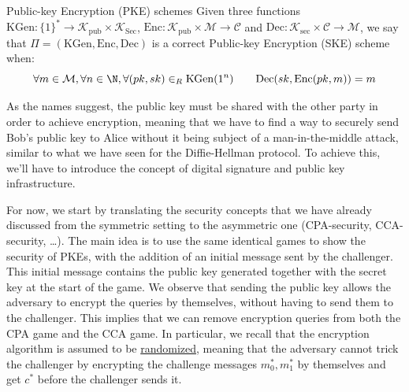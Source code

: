 \documentclass[a4paper, 12pt]{report}
\begin{document}
    \begin{frameddefn}{Public-key Encryption (PKE) schemes}
        Given three functions $\mathrm{KGen} : \{1\}^* \to \mathcal{K}_{\mathrm{pub}} \times \mathcal{K}_\mathrm{Sec}$, $\mathrm{Enc} : \mathcal{K}_{\mathrm{pub}} \times \mathcal{M} \to \mathcal{C}$ and $\mathrm{Dec} : \mathcal{K}_{\mathrm{sec}} \times \mathcal{C} \to \mathcal{M}$, we say that $\Pi = (\mathrm{KGen}, \mathrm{Enc}, \mathrm{Dec})$ is a correct Public-key Encryption (SKE) scheme when:
        \[\forall m \in \mathcal{M}, \forall n \in \N, \forall (pk,sk) \in_R \mathrm{KGen}(1^n) \qquad \mathrm{Dec}(sk, \mathrm{Enc}(pk, m)) = m\]
    \end{frameddefn}

    As the names suggest, the public key must be shared with the other party in order to achieve encryption, meaning that we have to find a way to securely send Bob's public key to Alice without it being subject of a man-in-the-middle attack, similar to what we have seen for the Diffie-Hellman protocol. To achieve this, we'll have to introduce the concept of digital signature and public key infrastructure.

    For now, we start by translating the security concepts that we have already discussed from the symmetric setting to the asymmetric one (CPA-security, CCA-security, \dots). The main idea is to use the same identical games to show the security of PKEs, with the addition of an initial message sent by the challenger. This initial message contains the public key generated together with the secret key at the start of the game. We observe that sending the public key allows the adversary to encrypt the queries by themselves, without having to send them to the challenger. This implies that we can remove encryption queries from both the CPA game and the CCA game. In particular, we recall that the encryption algorithm is assumed to be \underline{randomized}, meaning that the adversary cannot trick the challenger by encrypting the challenge messages $m_0^*, m_1^*$ by themselves and get $c^*$ before the challenger sends it. 
\end{document}
